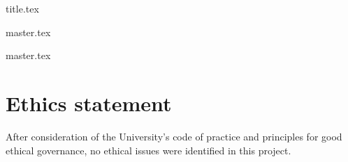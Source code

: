 \documentclass[a4paper, 12pt]{article}
\begin{document}
{title.tex}





\setcounter{tocdepth}{3} %

\tableofcontents

\newpage









\newpage

{master.tex}

\newpage


{master.tex}





\newpage











\section{Ethics statement}

After consideration of the University's code of practice and principles for good ethical governance, no ethical issues were identified in this project. 


\newpage





\end{document}
